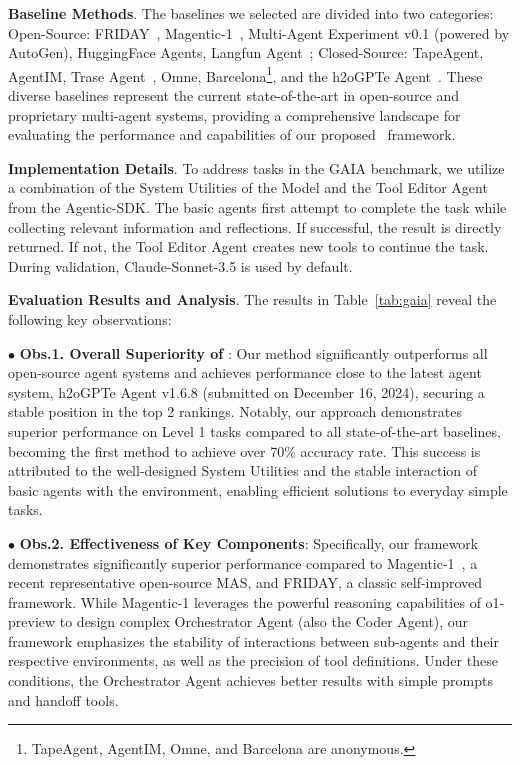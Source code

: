 \noindent \textbf{Baseline Methods}.
The baselines we selected are divided into two categories: Open-Source: FRIDAY~\cite{wu2024copilot}, Magentic-1~\cite{Magentic}, Multi-Agent Experiment v0.1 (powered by AutoGen)\cite{microsoft2024gaiamultiagent}, HuggingFace Agents\cite{huggingface2025transformersagents}, Langfun Agent~\cite{google2025langfun}; Closed-Source: TapeAgent, AgentIM, Trase Agent~\cite{trasesystems2025}, Omne, Barcelona\footnote{TapeAgent, AgentIM, Omne, and Barcelona are anonymous.}, and the h2oGPTe Agent~\cite{h2oai2025enterpriseh2ogpte}. These diverse baselines represent the current state-of-the-art in open-source and proprietary multi-agent systems, providing a comprehensive landscape for evaluating the performance and capabilities of our proposed \model\ framework.

\noindent \textbf{Implementation Details}.
To address tasks in the GAIA benchmark, we utilize a combination of the System Utilities of the {Model} and the Tool Editor Agent from the Agentic-SDK. The basic agents first attempt to complete the task while collecting relevant information and reflections. If successful, the result is directly returned. If not, the Tool Editor Agent creates new tools to continue the task. During validation, Claude-Sonnet-3.5 is used by default.

\noindent \textbf{Evaluation Results and Analysis}.
The results in Table~\ref{tab:gaia} reveal the following key observations:

$\bullet$ \textbf{Obs.1. Overall Superiority of \model}: Our method significantly outperforms all open-source agent systems and achieves performance close to the latest agent system, h2oGPTe Agent v1.6.8 (submitted on December 16, 2024), securing a stable position in the top 2 rankings. Notably, our approach demonstrates superior performance on Level 1 tasks compared to all state-of-the-art baselines, becoming the first method to achieve over 70\% accuracy rate. This success is attributed to the well-designed System Utilities and the stable interaction of basic agents with the environment, enabling efficient solutions to everyday simple tasks.


$\bullet$ \textbf{Obs.2. Effectiveness of Key Components}: Specifically, our framework demonstrates significantly superior performance compared to Magentic-1~\cite{Magentic}, a recent representative open-source MAS, and FRIDAY, a classic self-improved framework. While Magentic-1 leverages the powerful reasoning capabilities of o1-preview to design complex Orchestrator Agent (also the Coder Agent), our framework emphasizes the stability of interactions between sub-agents and their respective environments, as well as the precision of tool definitions. Under these conditions, the Orchestrator Agent achieves better results with simple prompts and handoff tools.

